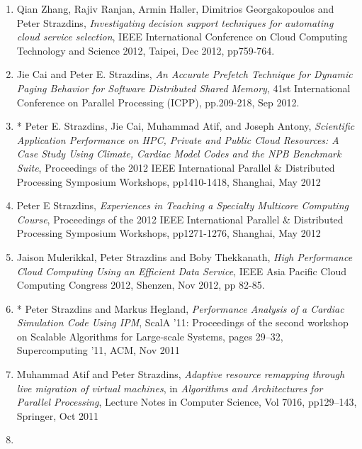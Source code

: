 \documentclass[a4paper,oneside,12pt]{article}
\begin{document}
\begin{enumerate}
\item Qian Zhang, Rajiv Ranjan, Armin Haller, Dimitrios Georgakopoulos
  and Peter Strazdins, {\em Investigating decision support techniques           
  for automating cloud service selection}, IEEE International
  Conference on Cloud Computing Technology and Science 2012,
  Taipei, Dec 2012, pp759-764.

\item Jie Cai and Peter E. Strazdins,
{\em An Accurate Prefetch Technique for                                         
Dynamic Paging Behavior for Software Distributed Shared Memory},
41st International Conference on Parallel Processing (ICPP),
pp.209-218, Sep 2012.

\item * Peter E. Strazdins,  Jie Cai, Muhammad Atif, and Joseph Antony,
{\em Scientific Application Performance on HPC, Private                         
and Public Cloud Resources: A Case Study Using                                  
Climate, Cardiac Model Codes and the NPB                                        
Benchmark Suite},
Proceedings of the 2012 IEEE International Parallel \& Distributed
Processing Symposium Workshops, pp1410-1418, Shanghai, May 2012


\item  Peter E Strazdins,
{\em Experiences in Teaching a Specialty Multicore Computing Course},
    Proceedings of the 2012 IEEE International Parallel \& Distributed
  Processing Symposium Workshops, pp1271-1276, Shanghai, May 2012

\item Jaison Mulerikkal, Peter Strazdins and Boby Thekkanath, {\em High         
Performance Cloud Computing Using an Efficient Data Service},
IEEE Asia Pacific Cloud Computing Congress 2012, Shenzen,
Nov 2012, pp 82-85.

\item * Peter Strazdins and Markus Hegland, {\em Performance Analysis
  of a Cardiac Simulation Code Using IPM}, ScalA '11: Proceedings of
  the second workshop on Scalable Algorithms for Large-scale Systems,
  pages 29--32, Supercomputing '11, ACM, Nov 2011

\item Muhammad Atif and Peter Strazdins, {\em Adaptive resource                 
  remapping through live migration of virtual machines}, in
 {\em Algorithms and Architectures for Parallel Processing},
 Lecture Notes in Computer Science, Vol 7016, pp129--143,
 Springer, Oct 2011

\item


\end{enumerate}
\end{document}
